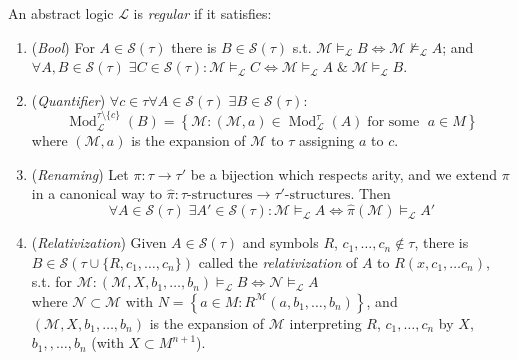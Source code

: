 \documentclass[UTF8,aspectratio=43,11pt,colorlinks,compress,openany]{beamer}%
\begin{document}
\begin{frame}\frametitle{}\vspace{-1ex}
	\begin{definition}
		An abstract logic $\mathcal{L}$ is \emph{regular} if it satisfies:
		\begin{enumerate}
			\item (\emph{Bool}) For $A\in\mathcal{S}(\tau)$ there is $B\in \mathcal{S}(\tau)$ s.t. $\mathcal{M}\vDash_{\mathcal{L}} B\iff\mathcal{M}\nvDash_{\mathcal{L}} A$; and $\forall A, B\in \mathcal{S}(\tau)\;\exists C\in \mathcal{S}(\tau): \mathcal{M}\vDash_{\mathcal{L}} C\iff\mathcal{M}\vDash_{\mathcal{L}} A\;\&\;\mathcal{M}\vDash_{\mathcal{L}} B$.
			\item (\emph{Quantifier}) $\forall c\in\tau\forall A \in \mathcal{S}(\tau)\;\exists B \in \mathcal{S}(\tau):$\vspace{-1ex}
			\[
			\operatorname{Mod}_{\mathcal{L}}^{\tau\setminus\!\{c\}}(B)=\left\{\mathcal{M}: (\mathcal{M},a) \in \operatorname{Mod}_{\mathcal{L}}^\tau(A)\;\text{for some }\;a \in M\right\}
			\]
			where $(\mathcal{M},a)$ is the expansion of $\mathcal{M}$ to $\tau$ assigning $a$ to $c$.
			\item (\emph{Renaming}) Let $\pi:\tau\to\tau'$ be a bijection which respects arity, and we extend $\pi$ in a canonical way to $\hat{\pi}:\tau\text{-structures}\to\tau'\text{-structures}$. Then\vspace{-1ex}
			\[\forall A\in \mathcal{S}(\tau)\;\exists A'\in \mathcal{S}(\tau): \mathcal{M}\vDash_{\mathcal{L}} A\iff\hat{\pi}(\mathcal{M})\vDash_{\mathcal{L}} A'\]
			\item (\emph{Relativization}) Given $A\in\mathcal{S}(\tau)$ and symbols $R$, $c_1,\dots,c_n\notin\tau$, there is $B\in\mathcal{S}(\tau\cup \{R,c_1,\ldots,c_n\})$ called the \emph{relativization} of $A$ to $R(x, c_1,\dots c_n)$, s.t. for $\mathcal{M}: (\mathcal{M},X, b_1,\ldots,b_n)\vDash_{\mathcal{L}} B \iff \mathcal{N} \vDash_{\mathcal{L}} A$\\
			where $\mathcal{N}\subset\mathcal{M}$ with $N=\left\{a\in M: R^{\mathcal{M}}(a, b_1, \dots, b_n)\right\}$, and $(\mathcal{M},X, b_1, \ldots,b_n)$ is the expansion of $\mathcal{M}$ interpreting $R$, $c_1,\dots,c_n$ by $X$, $b_1,,\dots,b_n$ (with $X
			\subset M^{n+1}$).
		\end{enumerate}
	\end{definition}
\end{frame}
\end{document}
